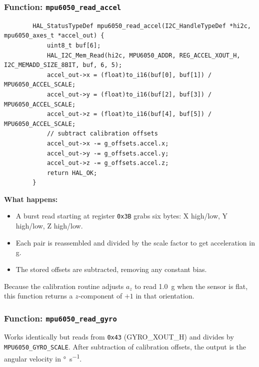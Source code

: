 \documentclass[12pt,a4paper]{article}
\newcommand{\func}[1]{\texttt{#1}}
\begin{document}
	\subsubsection*{Function: \func{mpu6050\_read\_accel}}
	\begin{lstlisting}
		HAL_StatusTypeDef mpu6050_read_accel(I2C_HandleTypeDef *hi2c, mpu6050_axes_t *accel_out) {
			uint8_t buf[6];
			HAL_I2C_Mem_Read(hi2c, MPU6050_ADDR, REG_ACCEL_XOUT_H, I2C_MEMADD_SIZE_8BIT, buf, 6, 5);
			accel_out->x = (float)to_i16(buf[0], buf[1]) / MPU6050_ACCEL_SCALE;
			accel_out->y = (float)to_i16(buf[2], buf[3]) / MPU6050_ACCEL_SCALE;
			accel_out->z = (float)to_i16(buf[4], buf[5]) / MPU6050_ACCEL_SCALE;
			// subtract calibration offsets
			accel_out->x -= g_offsets.accel.x;
			accel_out->y -= g_offsets.accel.y;
			accel_out->z -= g_offsets.accel.z;
			return HAL_OK;
		}
	\end{lstlisting}
	\textbf{What happens:}
	\begin{itemize}
		\item A burst read starting at register \texttt{0x3B} grabs six bytes: X high/low, Y high/low, Z high/low.
		\item Each pair is reassembled and divided by the scale factor to get acceleration in \si{g}.
		\item The stored offsets are subtracted, removing any constant bias.
	\end{itemize}
	Because the calibration routine adjusts \(a_z\) to read \SI{1.0}{g} when the sensor is flat, this function returns a \(z\)‑component of \(+1\) in that orientation.
	
	\subsubsection*{Function: \func{mpu6050\_read\_gyro}}
	Works identically but reads from \texttt{0x43} (GYRO\_XOUT\_H) and divides by \texttt{MPU6050\_GYRO\_SCALE}. After subtraction of calibration offsets, the output is the angular velocity in \si{\degree\per\second}.
	
\end{document}
